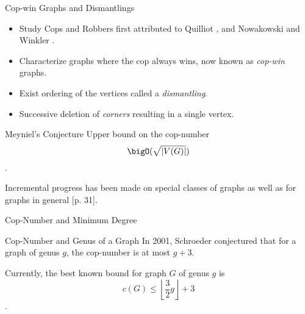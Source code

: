 \begin{frame}{Cop-win Graphs and Dismantlings}
\begin{itemize}
  \item<1-> Study Cops and Robbers first attributed to Quilliot \cite{quilliot1978jeux}, and Nowakowski and Winkler \cite{nowakowski1983vertex}.

  \item<2-> Characterize graphs where the cop always wins, now known as \textit{cop-win} graphs.

 \item<3-> Exist ordering of the vertices called a \textit{dismantling}.

 \item<4-> Successive deletion of \textit{corners} resulting in a single vertex.
\end{itemize}
\end{frame}

\begin{frame}{Meyniel's Conjecture}
Upper bound on the cop-number \cite{frankl1987cops}
   \[ \bigO(\sqrt{\lvert V(G)\rvert }) \].

Incremental progress has been made on special classes of graphs as well as for graphs in general  \cite{gera2016graph}[p. 31].
\end{frame}

\begin{frame}{Cop-Number and Minimum Degree}
\end{frame}

\begin{frame}{Cop-Number and Genus of a Graph}
  In 2001, Schroeder conjectured \cite{bonato2017topological} that for a graph of genus $g$,
  the cop-number is at most $g+3$.

  \vspace{1cm}

  Currently, the best known bound \cite{schroder2001copnumber} for graph $G$ of genus $g$ is
  \[c(G) \leq \left\lfloor \frac{3}{2}g \right\rfloor +3\] .

\end{frame}
